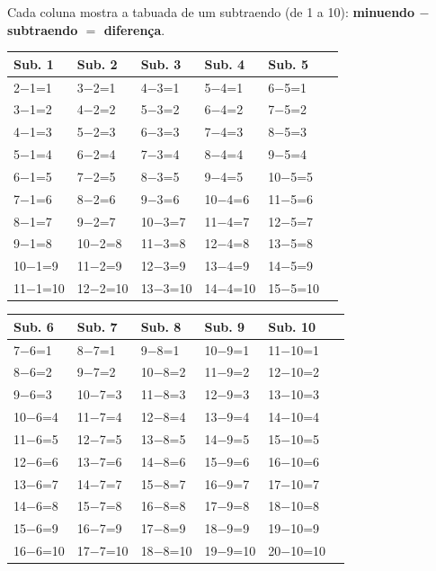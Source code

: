\documentclass[12pt]{article}
\begin{document}
Cada coluna mostra a tabuada de um subtraendo (de 1 a 10):
\textbf{minuendo $-$ subtraendo $=$ diferença}.

\vspace{0.4cm}

\setlength{\tabcolsep}{14pt}
\begin{tabular}{llllll}
\textbf{Sub. 1} & \textbf{Sub. 2} & \textbf{Sub. 3} & \textbf{Sub. 4} & \textbf{Sub. 5} \\
\hline
2$-$1=1 & 3$-$2=1 & 4$-$3=1 & 5$-$4=1 & 6$-$5=1 \\
3$-$1=2 & 4$-$2=2 & 5$-$3=2 & 6$-$4=2 & 7$-$5=2 \\
4$-$1=3 & 5$-$2=3 & 6$-$3=3 & 7$-$4=3 & 8$-$5=3 \\
5$-$1=4 & 6$-$2=4 & 7$-$3=4 & 8$-$4=4 & 9$-$5=4 \\
6$-$1=5 & 7$-$2=5 & 8$-$3=5 & 9$-$4=5 & 10$-$5=5 \\
7$-$1=6 & 8$-$2=6 & 9$-$3=6 & 10$-$4=6 & 11$-$5=6 \\
8$-$1=7 & 9$-$2=7 & 10$-$3=7 & 11$-$4=7 & 12$-$5=7 \\
9$-$1=8 & 10$-$2=8 & 11$-$3=8 & 12$-$4=8 & 13$-$5=8 \\
10$-$1=9 & 11$-$2=9 & 12$-$3=9 & 13$-$4=9 & 14$-$5=9 \\
11$-$1=10 & 12$-$2=10 & 13$-$3=10 & 14$-$4=10 & 15$-$5=10 \\
\end{tabular}

\vspace{0.5cm}

\begin{tabular}{llllll}
\textbf{Sub. 6} & \textbf{Sub. 7} & \textbf{Sub. 8} & \textbf{Sub. 9} & \textbf{Sub. 10} \\
\hline
7$-$6=1 & 8$-$7=1 & 9$-$8=1 & 10$-$9=1 & 11$-$10=1 \\
8$-$6=2 & 9$-$7=2 & 10$-$8=2 & 11$-$9=2 & 12$-$10=2 \\
9$-$6=3 & 10$-$7=3 & 11$-$8=3 & 12$-$9=3 & 13$-$10=3 \\
10$-$6=4 & 11$-$7=4 & 12$-$8=4 & 13$-$9=4 & 14$-$10=4 \\
11$-$6=5 & 12$-$7=5 & 13$-$8=5 & 14$-$9=5 & 15$-$10=5 \\
12$-$6=6 & 13$-$7=6 & 14$-$8=6 & 15$-$9=6 & 16$-$10=6 \\
13$-$6=7 & 14$-$7=7 & 15$-$8=7 & 16$-$9=7 & 17$-$10=7 \\
14$-$6=8 & 15$-$7=8 & 16$-$8=8 & 17$-$9=8 & 18$-$10=8 \\
15$-$6=9 & 16$-$7=9 & 17$-$8=9 & 18$-$9=9 & 19$-$10=9 \\
16$-$6=10 & 17$-$7=10 & 18$-$8=10 & 19$-$9=10 & 20$-$10=10 \\
\end{tabular}


\end{document}
